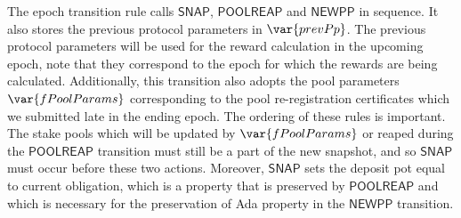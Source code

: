 The epoch transition rule calls $\mathsf{SNAP}$, $\mathsf{POOLREAP}$ and $\mathsf{NEWPP}$
in sequence. It also stores the previous protocol parameters in $\var{prevPp}$.
The previous protocol parameters will be used for the reward calculation in the upcoming epoch,
note that they correspond to the epoch for which the rewards are being calculated.
Additionally, this transition also adopts the pool parameters $\var{fPoolParams}$
corresponding to the pool re-registration certificates which we submitted late in the ending epoch.
The ordering of these rules is important.
The stake pools which will be updated by $\var{fPoolParams}$ or
reaped during the $\mathsf{POOLREAP}$ transition must still be a
part of the new snapshot, and so $\mathsf{SNAP}$ must occur before these two actions.
Moreover, $\mathsf{SNAP}$ sets the deposit pot equal to current obligation,
which is a property that is preserved by $\mathsf{POOLREAP}$ and which
is necessary for the preservation of Ada property in the $ \mathsf{NEWPP}$ transition.

